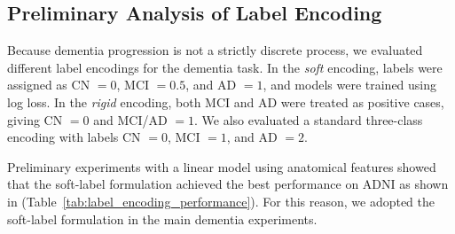 \documentclass[pdflatex,sn-nature]{sn-jnl}%
\theoremstyle{thmstyleone}%
\theoremstyle{thmstyletwo}%
\theoremstyle{thmstylethree}%
\begin{document}
\begin{appendices}
\FloatBarrier


\subsection{Preliminary Analysis of Label Encoding}
\label{sec:label_encoding}

Because dementia progression is not a strictly discrete process, we evaluated different label encodings for the dementia task. In the \emph{soft} encoding, labels were assigned as CN $=0$, MCI $=0.5$, and AD $=1$, and models were trained using log loss. In the \emph{rigid} encoding, both MCI and AD were treated as positive cases, giving CN $=0$ and MCI/AD $=1$. We also evaluated a standard three-class encoding with labels CN $=0$, MCI $=1$, and AD $=2$.

Preliminary experiments with a linear model using anatomical features showed that the soft-label formulation achieved the best performance on ADNI as shown in (Table~\ref{tab:label_encoding_performance}). For this reason, we adopted the soft-label formulation in the main dementia experiments.


\end{appendices}
\end{document}
